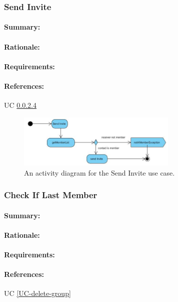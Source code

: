 \documentclass[11pt]{article}
\begin{document}
\subsubsection{Send Invite} \label{FR-invite}
\paragraph{Summary:}
\paragraph{Rationale:}
\paragraph{Requirements:}
\paragraph{References:} UC \ref{}
 \begin{figure}[H]
 \centering
 \includegraphics[width=3in]{./images/process-sendInvite.jpg}
 \caption[Send Invite Activity Diagram]{An activity diagram for the Send Invite use case.}
 \label{FR-figure-send-invite}
 \end{figure}
 
\subsubsection{Check If Last Member} \label{FR-delete-group}
\paragraph{Summary:}
\paragraph{Rationale:}
\paragraph{Requirements:}
\paragraph{References:} UC \ref{UC-delete-group}
\end{document}
